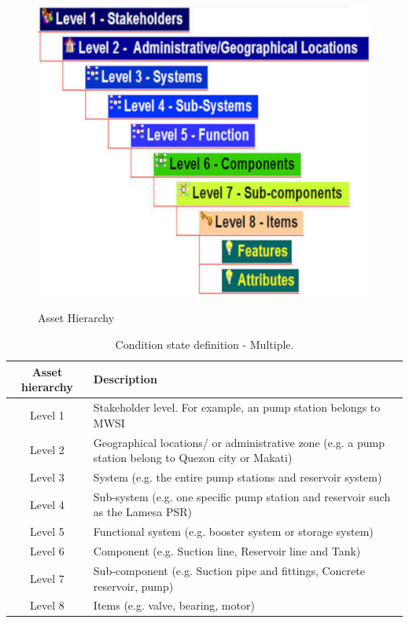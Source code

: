 \begin{figure}[!htb]
	\includegraphics[scale=1.3]{figures/ch02_assethierarchy} \\
	\caption{Asset Hierarchy}
	\label{ch02_assethierachy} 
\end{figure}

\begin{table}[h]
	\caption{Condition state definition - Multiple.}
	\label{ch02_tbl_assethierachy}
	{\footnotesize
\begin{tabular}{l|p{10cm}}
	\hline
	\multicolumn{1}{c|}{Asset hierarchy} & Description \\ 
	\hline
	\multicolumn{1}{c|}{Level 1} & Stakeholder level. For example, an pump station belongs to MWSI \\ 
	\multicolumn{1}{c|}{Level 2} & Geographical locations/ or administrative zone (e.g. a pump station belong to Quezon city or Makati) \\ 
	\multicolumn{1}{c|}{Level 3} & System (e.g. the entire pump stations and reservoir system) \\ 
	\multicolumn{1}{c|}{Level 4} & Sub-system (e.g. one specific pump station and reservoir such as the Lamesa PSR) \\ 
	\multicolumn{1}{c|}{Level 5} & Functional system (e.g. booster system or storage system) \\ 
	\multicolumn{1}{c|}{Level 6} & Component (e.g. Suction line, Reservoir line and Tank) \\ 
	\multicolumn{1}{c|}{Level 7} & Sub-component (e.g. Suction pipe and fittings, Concrete reservoir, pump) \\ 
	\multicolumn{1}{c|}{Level 8} & Items (e.g. valve, bearing, motor) \\ 
	\hline
\end{tabular}		
	}
\end{table}

